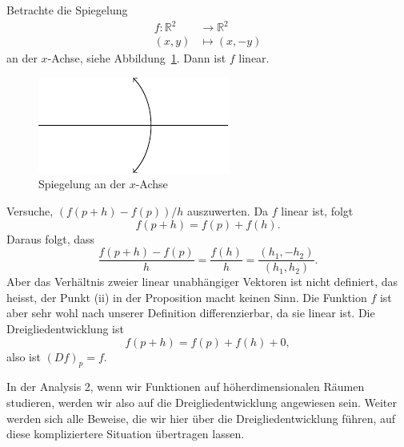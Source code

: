 \documentclass[../main.tex]{subfiles}
\begin{document}
\begin{example}
  Betrachte die Spiegelung
  \begin{align*}
    f \colon \mathbb{R}^2 & \to \mathbb{R}^2 \\
    (x, y) & \mapsto (x, -y)
  \end{align*}
  an der $x$-Achse, siehe
  Abbildung~\ref{fig:reflection}. Dann ist $f$ linear.

\begin{figure}[htb]
  \centering
  \includegraphics{images/reflection}
  \caption{Spiegelung an der $x$-Achse}%
  \label{fig:reflection}
\end{figure}

  Versuche,
$(f(p + h) - f(p))/h$
auszuwerten. Da $f$ linear ist, folgt
\[
  f(p + h) = f(p) + f(h).
\]
Daraus folgt, 
dass
\[
  \frac{f(p+h) - f(p)}{h} = \frac{f(h)}{h}
  = \frac{(h_1, -h_2)}{(h_1, h_2)}.
\]
Aber das Verhältnis zweier linear unabhängiger
Vektoren ist nicht definiert,
das heisst, der Punkt (ii) in der Proposition
macht keinen Sinn.
Die Funktion $f$ ist aber sehr wohl
nach unserer Definition differenzierbar,
da sie linear ist. Die Dreigliedentwicklung
ist
\[
  f(p + h) = f(p) + f(h) + 0,
\]
also ist ${(Df)}_p = f$.

In der Analysis 2, wenn wir Funktionen
auf höherdimensionalen Räumen
studieren, werden wir also auf
die Dreigliedentwicklung angewiesen sein.
Weiter werden sich alle Beweise, die wir
hier über die Dreigliedentwicklung führen,
auf diese kompliziertere Situation
übertragen lassen.
\end{example}
\end{document}

